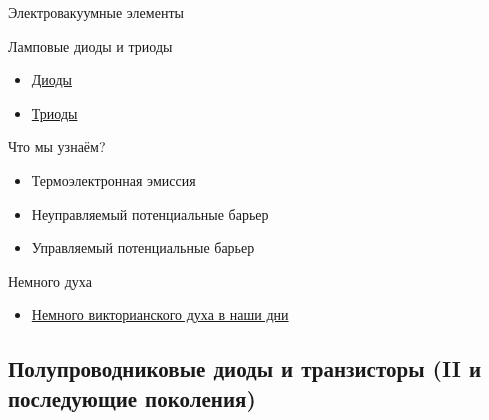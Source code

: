 \documentclass[xetex,aspectratio=43]{beamer}
\begin{document}
\begin{frame}{Электровакуумные элементы}

\begin{block}{Ламповые диоды и триоды }
\begin{itemize}
    \item \href{https://en.wikipedia.org/wiki/Vacuum_tube\#Diodes}{Диоды}
    \item \href{https://en.wikipedia.org/wiki/Vacuum_tube\#Triodes}{Триоды}
\end{itemize}
\end{block}

\begin{block}{Что мы узнаём?}
\begin{itemize}
    \item Термоэлектронная эмиссия
    \item Неуправляемый потенциальные барьер
    \item Управляемый потенциальные барьер
\end{itemize}

\end{block}


\pause

\begin{block}{Немного духа}
\begin{itemize}
    \item \href{\ytlink{EzyXMEpq4qw}}{Немного викторианского духа в наши дни}
\end{itemize}

\end{block}

\end{frame}

\subsection[Полупроводниковые диоды и транзисторы, II+]{Полупроводниковые диоды и транзисторы (II и последующие поколения)}
\end{document}
